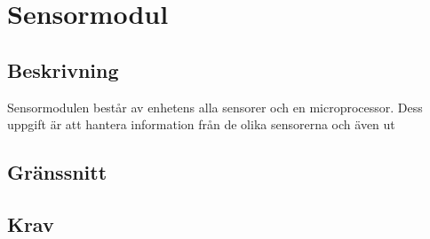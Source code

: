 \documentclass[kravspec/krav.tex]{subfiles}
\begin{document}
\clearpage
\section{Sensormodul}
\subsection{Beskrivning}
Sensormodulen består av enhetens alla sensorer och en microprocessor. Dess
uppgift är att hantera information från de olika sensorerna och även
ut
\subsection{Gränssnitt}
\subsection{Krav}
\end{document}
